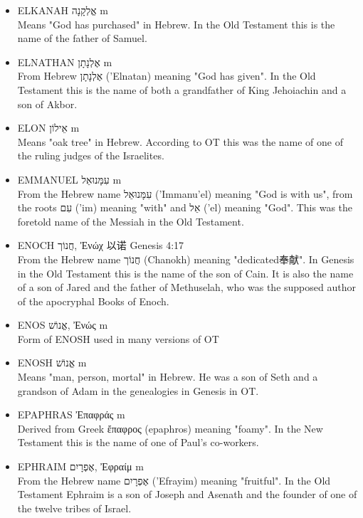 \begin{itemize}
\item {ELKANAH אֱלְקָנָה m}\\
Means "God has purchased" in Hebrew. In the Old Testament this is the name of the father of Samuel.

\item {ELNATHAN אֶלְנָתָן m}\\
From Hebrew אֶלְנָתָן ('Elnatan) meaning "God has given". In the Old Testament this is the name of both a grandfather of King Jehoiachin and a son of Akbor.

\item {ELON אֵילוֹן m}\\
Means "oak tree" in Hebrew. According to OT this was the name of one of the ruling judges of the Israelites.

\item {EMMANUEL עִמָּנוּאֵל m}\\
From the Hebrew name עִמָּנוּאֵל ('Immanu'el) meaning "God is with us", from the roots עִם ('im) meaning "with" and אֵל ('el) meaning "God". This was the foretold name of the Messiah in the Old Testament. 

\item {ENOCH חֲנוֹך, Ἐνώχ 以诺 Genesis 4:17}\\
From the Hebrew name חֲנוֹך (Chanokh) meaning "dedicated奉献". In Genesis in the Old Testament this is the name of the son of Cain. It is also the name of a son of Jared and the father of Methuselah, who was the supposed author of the apocryphal Books of Enoch.

\item {ENOS אֱנוֹשׁ, Ἐνώς m}\\
Form of ENOSH used in many versions of OT

\item {ENOSH אֱנוֹשׁ m}\\
Means "man, person, mortal" in Hebrew. He was a son of Seth and a grandson of Adam in the genealogies in Genesis in OT.

\item {EPAPHRAS Ἐπαφράς m}\\
Derived from Greek ἔπαφρος (epaphros) meaning "foamy". In the New Testament this is the name of one of Paul's co-workers.

\item {EPHRAIM אֶפְרָיִם, Ἐφραίμ m}\\
From the Hebrew name אֶפְרָיִם ('Efrayim) meaning "fruitful". In the Old Testament Ephraim is a son of Joseph and Asenath and the founder of one of the twelve tribes of Israel.


\end{itemize}
